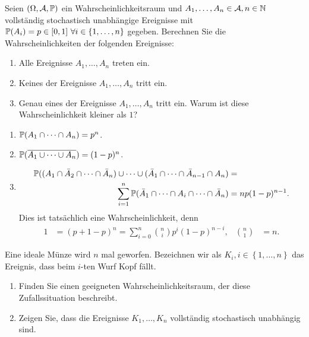  Seien $(\Omega,
\mathcal A, \mathbb P)$ ein Wahrscheinlichkeitsraum und $A_1,\dots, A_n \in\mathcal A, n\in\mathbb N$
vollständig stochastisch unabhängige Ereignisse mit $\mathbb P(A_i)=p\in[0,1]\ \forall
i\in \left\{ 1,\dots,n \right\}$ gegeben. Berechnen Sie die
Wahrscheinlichkeiten der folgenden Ereignisse:
\begin{enumerate}
    \item Alle Ereignisse $A_1,\dots, A_n$ treten ein.
    \item Keines der Ereignisse $A_1, \dots, A_n$ tritt ein. 
    \item Genau eines der Ereignisse $A_1, \dots, A_n$ tritt ein. Warum 
        ist diese Wahrscheinlichkeit kleiner als $1$?
\end{enumerate}

\solution
\begin{enumerate}
    \item $\mathbb P(A_1 \cap \dots \cap A_n) = p^n$.
    \item $\mathbb P(\overline{A_1 \cup \dots \cup A_n}) = (1-p)^n$.
    \item \begin{align*}
            \mathbb P( (A_1 \cap \bar A_2 \cap \dots \cap \bar A_n)  \cup\dots\cup (\bar A_1 \cap \dots \cap \bar A_{n-1} \cap A_n) &= \\
            \sum_{i=1}^{n} \mathbb P(\bar A_1 \cap \dots \cap A_i \cap \dots \cap \bar A_n) &= n p (1-p)^{n-1}. 
        \end{align*}
        Dies ist tatsächlich eine Wahrscheinlichkeit, denn
        \begin{align*}
            1 &= (p + 1-p)^{n} = \sum_{i=0}^{n} \binom{n}{i} p^{i}(1-p)^{n-i}, &
            \binom{n}{1} &= n.
        \end{align*}
\end{enumerate}



 Eine ideale Münze wird $n$ mal geworfen.
Bezeichnen wir als $K_i, i\in \left\{1,\dots,n\right\}$ das Ereignis, dass
beim $i$-ten Wurf Kopf fällt. 
\begin{enumerate}
    \item Finden Sie einen geeigneten Wahrscheinlichkeitsraum, der diese
        Zufallssituation beschreibt.
    \item Zeigen Sie, dass die Ereignisse $K_1,\dots, K_n$ vollständig 
        stochastisch unabhängig sind.
\end{enumerate}


